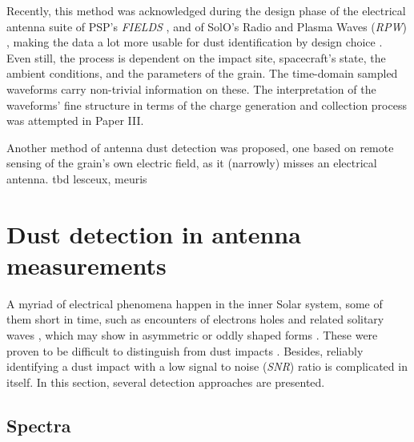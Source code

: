 Recently, this method was acknowledged during the design phase of the electrical antenna suite of PSP's \textit{FIELDS} \citep{bale2016fields}, and of SolO's Radio and Plasma Waves (\textit{RPW}) \citep{maksimovic2020solar}, making the data a lot more usable for dust identification by design choice \citep{mann2019dust}. Even still, the process is dependent on the impact site, spacecraft's state, the ambient conditions, and the parameters of the grain. The time-domain sampled waveforms carry non-trivial information on these. The interpretation of the waveforms' fine structure in terms of the charge generation and collection process was attempted in Paper III. 

Another method of antenna dust detection was proposed, one based on remote sensing of the grain's own electric field, as it (narrowly) misses an electrical antenna. tbd lesceux, meuris

\citep{meyer2001detecting}


\section{Dust detection in antenna measurements}

A myriad of electrical phenomena happen in the inner Solar system, some of them short in time, such as encounters of electrons holes and related solitary waves \citep{malaspina2013electrostatic,steinvall2019multispacecraft}, which may show in asymmetric or oddly shaped forms \citep{pickett2004solitary}. These were proven to be difficult to distinguish from dust impacts \citep{malaspina2016database,vaverka2018comparison}. Besides, reliably identifying a dust impact with a low signal to noise (\textit{SNR}) ratio is complicated in itself. In this section, several detection approaches are presented.

\subsection{Spectra}

